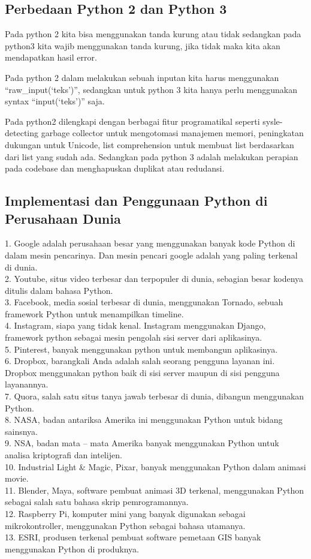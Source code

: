 \subsection{Perbedaan Python 2 dan Python 3}

Pada python 2 kita bisa menggunakan tanda kurung atau tidak sedangkan pada python3 kita wajib menggunakan tanda kurung, jika tidak maka kita akan mendapatkan hasil error.

Pada python 2 dalam melakukan sebuah inputan kita harus menggunakan “raw_input(‘teks’)”, sedangkan untuk python 3 kita hanya perlu menggunakan syntax “input(‘teks’)” saja.

Pada python2 dilengkapi dengan berbagai fitur programatikal seperti sysle-detecting garbage collector untuk mengotomasi manajemen memori, peningkatan dukungan untuk Unicode, list comprehension untuk membuat list berdasarkan dari list yang sudah ada. Sedangkan pada python 3 adalah melakukan perapian pada codebase dan menghapuskan duplikat atau redudansi.

\subsection{Implementasi dan Penggunaan Python di Perusahaan Dunia}
1.	Google adalah perusahaan besar yang menggunakan banyak kode Python di dalam mesin pencarinya. Dan mesin pencari google adalah yang paling terkenal di dunia.\\
2.	Youtube, situs video terbesar dan terpopuler di dunia, sebagian besar kodenya ditulis dalam bahasa Python.\\
3.	Facebook, media sosial terbesar di dunia, menggunakan Tornado, sebuah framework Python untuk menampilkan timeline.\\
4.	Instagram, siapa yang tidak kenal. Instagram menggunakan Django, framework python sebagai mesin pengolah sisi server dari aplikasinya.\\
5.	Pinterest, banyak menggunakan python untuk membangun aplikasinya.\\
6.	Dropbox, barangkali Anda adalah salah seorang pengguna layanan ini. Dropbox menggunakan python baik di sisi server maupun di sisi pengguna layanannya.\\
7.	Quora, salah satu situs tanya jawab terbesar di dunia, dibangun menggunakan Python.\\
8.	NASA, badan antariksa Amerika ini menggunakan Python untuk bidang sainsnya.\\
9.	NSA, badan mata – mata Amerika banyak menggunakan Python untuk analisa kriptografi dan intelijen.\\
10.	Industrial Light & Magic, Pixar, banyak menggunakan Python dalam animasi movie.\\
11.	Blender, Maya, software pembuat animasi 3D terkenal, menggunakan Python sebagai salah satu bahasa skrip pemrogramannya.\\
12.	Raspberry Pi, komputer mini yang banyak digunakan sebagai mikrokontroller, menggunakan Python sebagai bahasa utamanya.\\
13.	ESRI, produsen terkenal pembuat software pemetaan GIS banyak menggunakan Python di produknya.\\

